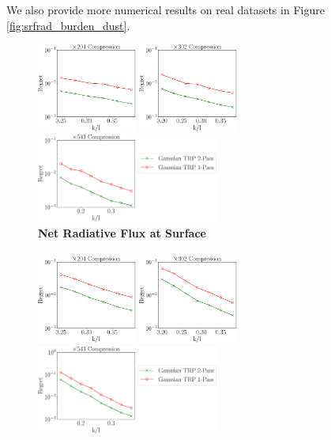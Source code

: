\label{appendix:more_real_data_result}

We also provide more numerical results on real datasets in Figure \ref{fig:srfrad_burden_dust}.
\begin{figure}[ht]
	\centering
	\includegraphics[height=2.9cm]{figure/multi_SRFRAD_frk8.pdf}
	\includegraphics[height=2.9cm]{figure/multi_SRFRAD_frk10.pdf}
	\includegraphics[height=2.9cm]{figure/multi_SRFRAD_frk15.pdf}\\
	\textbf{Net Radiative Flux at Surface}\\~\\
	\centering
	\includegraphics[height=2.9cm]{figure/multi_BURDENDUST_frk8.pdf}
	\includegraphics[height=2.9cm]{figure/multi_BURDENDUST_frk10.pdf}
	\includegraphics[height=2.9cm]{figure/multi_BURDENDUST_frk15.pdf}\\

\end{figure}
